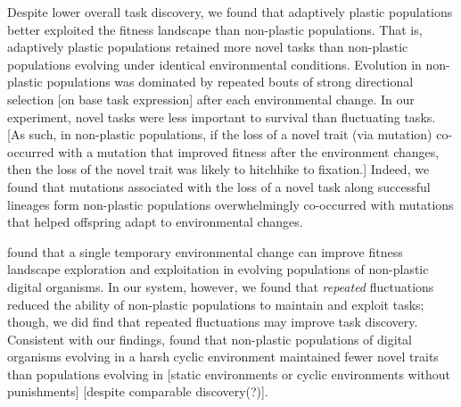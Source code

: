 Despite lower overall task discovery, we found that adaptively plastic populations better exploited the fitness landscape than non-plastic populations.
That is, adaptively plastic populations retained more novel tasks than non-plastic populations evolving under identical environmental conditions.
Evolution in non-plastic populations was dominated by repeated bouts of strong directional selection [on base task expression] after each environmental change. 
In our experiment, novel tasks were less important to survival than fluctuating tasks.
[As such, in non-plastic populations, if the loss of a novel trait (via mutation) co-occurred with a mutation that improved fitness after the environment changes, then the loss of the novel trait was likely to hitchhike to fixation.] 
Indeed, we found that mutations associated with the loss of a novel task along successful lineages form non-plastic populations overwhelmingly co-occurred with mutations that helped offspring adapt to environmental changes.


\cite{nahum_improved_2017} found that a single temporary environmental change can improve fitness landscape exploration and exploitation in evolving populations of non-plastic digital organisms.
In our system, however, we found that \textit{repeated} fluctuations reduced the ability of non-plastic populations to maintain and exploit tasks; though, we did find that repeated fluctuations may improve task discovery. 
Consistent with our findings, \cite{canino-koning_fluctuating_2019} found that non-plastic populations of digital organisms evolving in a harsh cyclic environment maintained fewer novel traits than populations evolving in [static environments or cyclic environments without punishments] [despite comparable discovery(?)].

